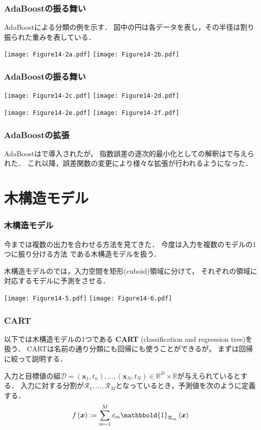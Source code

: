\documentclass[10pt,hyperref={unicode}]{beamer}
\newcommand{\parentheses}[1]{\left(#1\right)}
\begin{document}
\begin{frame}
\frametitle{AdaBoostの振る舞い}
AdaBoostによる分類の例を示す．
図中の円は各データを表し，その半径は割り振られた重みを表している．

\bigskip

\begin{center}
\texttt{[image: Figure14-2a.pdf]}
\texttt{[image: Figure14-2b.pdf]}
\end{center}
\end{frame}

\begin{frame}
\frametitle{AdaBoostの振る舞い}
\begin{center}
\texttt{[image: Figure14-2c.pdf]}
\texttt{[image: Figure14-2d.pdf]}
\end{center}
\begin{center}
\texttt{[image: Figure14-2e.pdf]}
\texttt{[image: Figure14-2f.pdf]}
\end{center}
\end{frame}

\begin{frame}
\frametitle{AdaBoostの拡張}
AdaBoostは\cite{freund1996}で導入されたが，
指数誤差の逐次的最小化としての解釈は\cite{friedman2000}で与えられた．
これ以降，誤差関数の変更により様々な拡張が行われるようになった．
\end{frame}

\section{木構造モデル}
\begin{frame}
\frametitle{木構造モデル}
今までは複数の出力を合わせる方法を見てきた．
今度は入力を複数のモデルの1つに振り分ける方法
である木構造モデルを扱う．

\bigskip

木構造モデルのでは，入力空間を矩形(cuboid)領域に分けて，
それぞれの領域に対応するモデルに予測をさせる．

\bigskip

\begin{center}
\texttt{[image: Figure14-5.pdf]}
\hspace{10pt}
\texttt{[image: Figure14-6.pdf]}
\end{center}
\end{frame}

\begin{frame}
\nocite{hastie2009}
\frametitle{CART}
以下では木構造モデルの1つである
\textbf{CART} (classification and regression tree)を扱う．
CARTは名前の通り分類にも回帰にも使うことができるが，
まずは回帰に絞って説明する．

\bigskip

入力と目標値の組$\mathcal{D} = \parentheses{\bm{x}_1,t_n},\ldots,\parentheses{\bm{x}_N,t_N} \in \mathbb{R}^D\times \mathbb{R}$が与えられているとする．
入力に対する分割が$\mathcal{R}_1,\ldots,\mathcal{R}_M$となっているとき，予測値を次のように定義する．
\begin{align*}
    f\parentheses{\bm{x}} := \sum_{m= 1}^M
    c_m \mathbbold{1}_{\mathcal{R}_m}\parentheses{\bm{x}}
\end{align*}
\end{frame}
\end{document}
